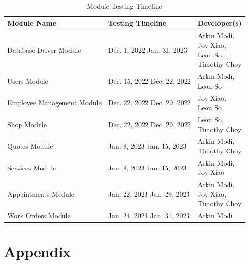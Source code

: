 \documentclass[12pt, titlepage]{article}
\begin{document}
\begin{table}[H]
	\caption{Module Testing Timeline} \label{ModuleTestingTimeline}
	\begin{tabular}{|p{}|p{}|p{}|}
		\hline
		\textbf{Module Name}       & \textbf{Testing Timeline}                 & \textbf{Developer(s)}    \\
		\hline
		Database Driver Module     & Dec. 1, 2022 \textemdash{} Jan. 31, 2023  & \makecell[l]{Arkin Modi, \\Joy Xiao,\\Leon So,\\Timothy Choy} \\
		\hline
		Users Module               & Dec. 15, 2022 \textemdash{} Dec. 22, 2022 & \makecell[l]{Arkin Modi, \\Leon So} \\
		\hline
		Employee Management Module & Dec. 22, 2022 \textemdash{} Dec. 29, 2022 & \makecell[l]{Joy Xiao,   \\Leon So} \\
		\hline
		Shop Module                & Dec. 22, 2022 \textemdash{} Dec. 29, 2022 & \makecell[l]{Leon So,    \\Timothy Choy} \\
		\hline
		Quotes Module              & Jan. 8, 2023 \textemdash{} Jan. 15, 2023  & \makecell[l]{Arkin Modi, \\Timothy Choy} \\
		\hline
		Services Module            & Jan. 8, 2023 \textemdash{} Jan. 15, 2023  & \makecell[l]{Arkin Modi, \\Joy Xiao} \\
		\hline
		Appointments Module        & Jan. 22, 2023 \textemdash{} Jan. 29, 2023 & \makecell[l]{Arkin Modi, \\Joy Xiao,\\Timothy Choy} \\
		\hline
		Work Orders Module         & Jan. 24, 2023 \textemdash{} Jan. 31, 2023 & Arkin Modi               \\
		\hline
	\end{tabular}
\end{table}

% 

\newpage

\section{Appendix}
\end{document}
